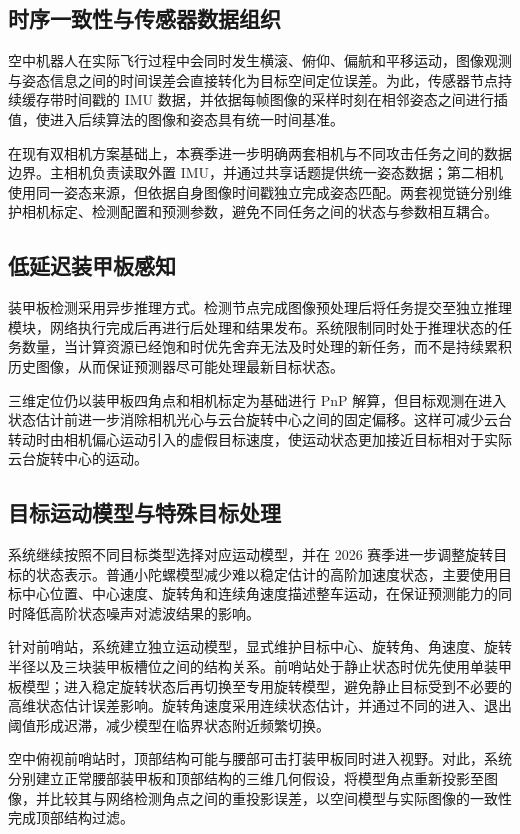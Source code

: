 \subsection{时序一致性与传感器数据组织}
空中机器人在实际飞行过程中会同时发生横滚、俯仰、偏航和平移运动，图像观测与姿态信息之间的时间误差会直接转化为目标空间定位误差。为此，传感器节点持续缓存带时间戳的 IMU 数据，并依据每帧图像的采样时刻在相邻姿态之间进行插值，使进入后续算法的图像和姿态具有统一时间基准。

在现有双相机方案基础上，本赛季进一步明确两套相机与不同攻击任务之间的数据边界。主相机负责读取外置 IMU，并通过共享话题提供统一姿态数据；第二相机使用同一姿态来源，但依据自身图像时间戳独立完成姿态匹配。两套视觉链分别维护相机标定、检测配置和预测参数，避免不同任务之间的状态与参数相互耦合。

\subsection{低延迟装甲板感知}
装甲板检测采用异步推理方式。检测节点完成图像预处理后将任务提交至独立推理模块，网络执行完成后再进行后处理和结果发布。系统限制同时处于推理状态的任务数量，当计算资源已经饱和时优先舍弃无法及时处理的新任务，而不是持续累积历史图像，从而保证预测器尽可能处理最新目标状态。

三维定位仍以装甲板四角点和相机标定为基础进行 PnP 解算，但目标观测在进入状态估计前进一步消除相机光心与云台旋转中心之间的固定偏移。这样可减少云台转动时由相机偏心运动引入的虚假目标速度，使运动状态更加接近目标相对于实际云台旋转中心的运动。

\subsection{目标运动模型与特殊目标处理}
系统继续按照不同目标类型选择对应运动模型，并在 2026 赛季进一步调整旋转目标的状态表示。普通小陀螺模型减少难以稳定估计的高阶加速度状态，主要使用目标中心位置、中心速度、旋转角和连续角速度描述整车运动，在保证预测能力的同时降低高阶状态噪声对滤波结果的影响。

针对前哨站，系统建立独立运动模型，显式维护目标中心、旋转角、角速度、旋转半径以及三块装甲板槽位之间的结构关系。前哨站处于静止状态时优先使用单装甲板模型；进入稳定旋转状态后再切换至专用旋转模型，避免静止目标受到不必要的高维状态估计误差影响。旋转角速度采用连续状态估计，并通过不同的进入、退出阈值形成迟滞，减少模型在临界状态附近频繁切换。

空中俯视前哨站时，顶部结构可能与腰部可击打装甲板同时进入视野。对此，系统分别建立正常腰部装甲板和顶部结构的三维几何假设，将模型角点重新投影至图像，并比较其与网络检测角点之间的重投影误差，以空间模型与实际图像的一致性完成顶部结构过滤。

